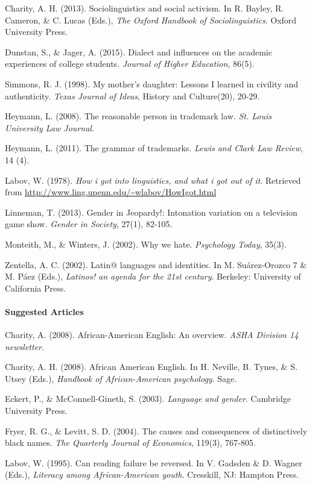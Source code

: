\documentclass[]{article}
\let\oldparagraph\paragraph
\renewcommand{\paragraph}[1]{\oldparagraph{#1}\mbox{}}
\begin{document}
Charity, A. H. (2013). Sociolinguistics and social activism. In R. Bayley, R. Cameron, \& C. Lucas (Eds.), \emph{The Oxford Handbook of Sociolinguistics}. Oxford University Press.

Dunstan, S., \& Jager, A. (2015). Dialect and influences on the academic experiences of college students. \emph{Journal of Higher Education}, 86(5).

Simmons, R. J. (1998). My mother’s daughter: Lessons I learned in civility and authenticity. \emph{Texas Journal of Ideas}, History and Culture(20), 20-29.

Heymann, L. (2008). The reasonable person in trademark law. \emph{St. Louis University Law Journal}.

Heymann, L. (2011). The grammar of trademarks. \emph{Lewis and Clark Law Review}, 14 (4).


Labov, W. (1978). \emph{How i got into linguistics, and what i got out of it}. Retrieved from \url{http://www.ling.upenn.edu/~wlabov/HowIgot.html}

Linneman, T. (2013). Gender in Jeopardy!: Intonation variation on a television game show. \emph{Gender in Society}, 27(1), 82-105.

Monteith, M., \& Winters, J. (2002). Why we hate. \emph{Psychology Today}, 35(3).

Zentella, A. C. (2002). Latin@ languages and identities. In M. Su\'{a}rez-Orozco 7 \& M. P\'{a}ez (Eds.), \emph{Latinos! an agenda for the 21st century}. Berkeley: University of California Press.

\paragraph{Suggested Articles}\label{suggested-articles}

Charity, A. (2008). African-American English: An overview. \emph{ASHA Division 14 newsletter}.

Charity, A. H. (2008). African American English. In H. Neville, B. Tynes, \& S. Utsey (Eds.), \emph{Handbook of African-American psychology}. Sage.

Eckert, P., \& McConnell-Gineth, S. (2003). \emph{Language and gender}. Cambridge University Press.

Fryer, R. G., \& Levitt, S. D. (2004). The causes and consequences of distinctively black names. \emph{The Quarterly Journal of Economics}, 119(3), 767-805.

Labov, W. (1995). Can reading failure be reversed. In V. Gadsden \& D. Wagner (Eds.), \emph{Literacy among African-American youth}. Cresskill, NJ: Hampton Press.
\end{document}
